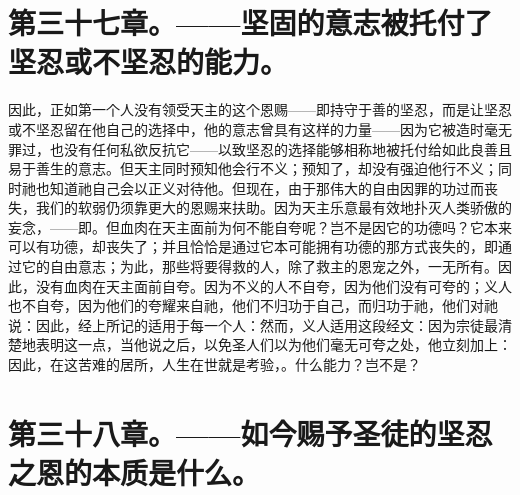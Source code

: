 
\section{第三十七章。——坚固的意志被托付了坚忍或不坚忍的能力。}

因此，正如第一个人没有领受天主的这个恩赐——即持守于善的坚忍，而是让坚忍或不坚忍留在他自己的选择中，他的意志曾具有这样的力量——因为它被造时毫无罪过，也没有任何私欲反抗它——以致坚忍的选择能够相称地被托付给如此良善且易于善生的意志。但天主同时预知他会行不义；预知了，却没有强迫他行不义；同时祂也知道祂自己会以正义对待他。但现在，由于那伟大的自由因罪的功过而丧失，我们的软弱仍须靠更大的恩赐来扶助。因为天主乐意最有效地扑灭人类骄傲的妄念，——即。但血肉在天主面前为何不能自夸呢？岂不是因它的功德吗？它本来可以有功德，却丧失了；并且恰恰是通过它本可能拥有功德的那方式丧失的，即通过它的自由意志；为此，那些将要得救的人，除了救主的恩宠之外，一无所有。因此，没有血肉在天主面前自夸。因为不义的人不自夸，因为他们没有可夸的；义人也不自夸，因为他们的夸耀来自祂，他们不归功于自己，而归功于祂，他们对祂说：因此，经上所记的适用于每一个人：然而，义人适用这段经文：因为宗徒最清楚地表明这一点，当他说之后，以免圣人们以为他们毫无可夸之处，他立刻加上：因此，在这苦难的居所，人生在世就是考验，。什么能力？岂不是？\par


\section{第三十八章。——如今赐予圣徒的坚忍之恩的本质是什么。}

